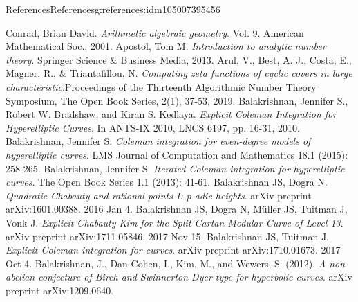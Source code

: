 \documentclass[oneside,10pt,]{book}
\numberwithin{equation}{section}
\begin{document}
\begin{references-chapter-numberless}{References}{}{References}{}{}{g:references:idm105007395456}
\begin{thebibliography}{9}
\hypertarget{x:biblio:bib-arith-alg-geom}{}Conrad, Brian David. \textit{Arithmetic algebraic geometry}. Vol. 9. American Mathematical Soc., 2001.
\hypertarget{x:biblio:bib-apostol}{}Apostol, Tom M. \textit{Introduction to analytic number theory}. Springer Science \& Business Media, 2013.
\hypertarget{x:biblio:bib-arul-bcmt}{}Arul, V., Best, A. J., Costa, E., Magner, R., \& Triantafillou, N. \textit{Computing zeta functions of cyclic covers in large characteristic}.Proceedings of the Thirteenth Algorithmic Number Theory Symposium, The Open Book Series, 2(1), 37-53, 2019.
\hypertarget{x:biblio:bib-balakrishnan-bradshaw-kedlaya}{}Balakrishnan, Jennifer S., Robert W. Bradshaw, and Kiran S. Kedlaya. \textit{Explicit Coleman Integration for Hyperelliptic Curves}. In ANTS-IX 2010, LNCS 6197, pp. 16-31, 2010.
\hypertarget{x:biblio:bib-balakrishnan-even}{}Balakrishnan, Jennifer S. \textit{Coleman integration for even-degree models of hyperelliptic curves}. LMS Journal of Computation and Mathematics 18.1 (2015): 258-265.
\hypertarget{x:biblio:bib-balakrishnan-iterated}{}Balakrishnan, Jennifer S. \textit{Iterated Coleman integration for hyperelliptic curves}. The Open Book Series 1.1 (2013): 41-61.
\hypertarget{x:biblio:bib-balakrishnan-dogra}{}Balakrishnan JS, Dogra N. \textit{Quadratic Chabauty and rational points I: p-adic heights}. arXiv preprint arXiv:1601.00388. 2016 Jan 4.
\hypertarget{x:biblio:bib-balakrishnan-dogra-muller-tuitman-vonk}{}Balakrishnan JS, Dogra N, Müller JS, Tuitman J, Vonk J. \textit{Explicit Chabauty-Kim for the Split Cartan Modular Curve of Level 13}. arXiv preprint arXiv:1711.05846. 2017 Nov 15.
\hypertarget{x:biblio:bib-balakrishnan-tuitman}{}Balakrishnan JS, Tuitman J. \textit{Explicit Coleman integration for curves}. arXiv preprint arXiv:1710.01673. 2017 Oct 4.
\hypertarget{x:biblio:bib-bala-nonab}{}Balakrishnan, J., Dan-Cohen, I., Kim, M., and Wewers, S. (2012). \textit{A non-abelian conjecture of Birch and Swinnerton-Dyer type for hyperbolic curves}. arXiv preprint arXiv:1209.0640.

\end{thebibliography}
\end{references-chapter-numberless}
\end{document}
